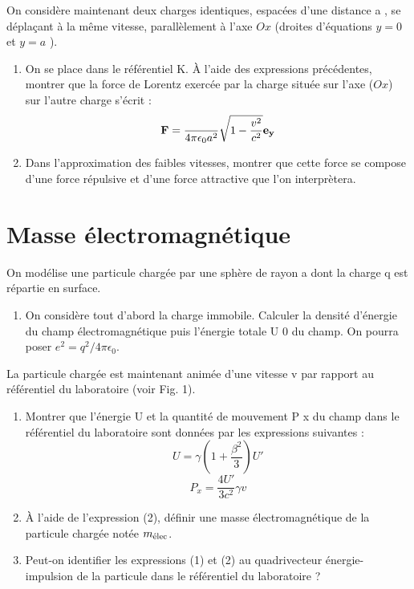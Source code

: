 On considère maintenant deux charges identiques, espacées d'une distance a , se déplaçant à la
même vitesse, parallèlement à l'axe $Ox$ (droites d'équations $y=0$ et $y=a$ ).
\begin{enumerate}
  \setcounter{enumi}{\thenumero}
  \item On se place dans le référentiel K. À l'aide des expressions précédentes, montrer que la force
de Lorentz exercée par la charge située sur l'axe ($Ox$) sur l'autre charge s'écrit :
\[
{\bf F}=\frac{}{4\pi\epsilon_0a^2}\sqrt{1-\frac{v^2}{c^2}}{\bf e_y}
\]
  \item Dans l'approximation des faibles vitesses, montrer que cette force se compose d'une force
répulsive et d'une force attractive que l'on interprètera.
\end{enumerate}
\section{Masse électromagnétique}%
On modélise une particule chargée par une sphère de rayon a dont la charge q est répartie en
surface.
\begin{enumerate}
  \item On considère tout d'abord la charge immobile. Calculer la densité d'énergie du champ
électromagnétique puis l'énergie totale U 0 du champ. On pourra poser $e^2 = q^2/4\pi\epsilon_0$.
\setcounter{numero}{\theenumi}\end{enumerate}
La particule chargée est maintenant animée d'une vitesse v par rapport au référentiel du
laboratoire (voir Fig. 1).
\begin{enumerate}
  \setcounter{enumi}{\thenumero}
  \item Montrer que l'énergie U et la quantité de mouvement P x du champ dans le référentiel du
laboratoire sont données par les expressions suivantes :
\[
U=\gamma(1+\frac{\beta^2}{3})U' \tag{1}
\] 
\begin{equation}
    P_x=\frac{4U'}{3c^2}\gamma v \tag{2}
\end{equation}
  \item À l'aide de l'expression (2), définir une masse électromagnétique de la particule chargée
notée $m_{\text{élec}}$.
  \item Peut-on identifier les expressions (1) et (2) au quadrivecteur énergie-impulsion de la particule dans le référentiel du laboratoire ?
\end{enumerate}
